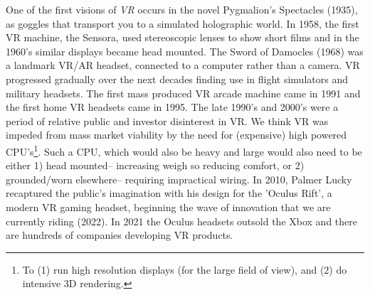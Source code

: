 \documentclass[logo,bsc,singlespacing,parskip]{infthesis}
\begin{document}
One of the first visions of \emph{VR} occurs in the novel Pygmalion's Spectacles (1935), as goggles that transport you to a simulated holographic world.
In 1958, the first VR machine, the Sensora, used stereoscopic lenses to show short films and in the 1960's similar displays became head mounted.
The Sword of Damocles (1968) was a landmark VR/AR headset, connected to a computer rather than a camera.
VR progressed gradually over the next decades finding use in flight simulators and military headsets.
The first mass produced VR arcade machine came in 1991 and the first home VR headsets came in 1995.
The late 1990's and 2000's were a period of relative public and investor disinterest in VR.
We think VR was impeded from mass market viability by the need for (expensive) high powered CPU's\footnote{To (1) run high resolution displays (for the large field of view), and (2) do intensive 3D rendering.}.
Such a CPU, which would also be heavy and large would also need to be either 1) head mounted-- increasing weigh so reducing comfort, or 2) grounded/worn elsewhere-- requiring impractical wiring.
In 2010, Palmer Lucky recaptured the public's imagination with his design for the 'Oculus Rift', a modern VR gaming headset, beginning the wave of innovation that we are currently riding (2022).
In 2021 the Oculus headsets outsold the Xbox and there are hundreds of companies developing VR products.
\end{document}
